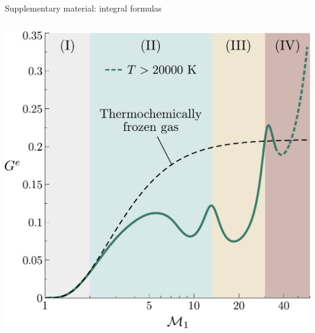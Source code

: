 \documentclass[9pt, aspectratio=1609]{beamer}
\begin{document}
\begin{frame}{\large Supplementary material: integral formulas}
\begin{columns}[c]
\begin{column}{.45\textwidth}
\begin{center}
        \includegraphics[width=1\textwidth]{figures/huete2021/G3D_AIAA2023.pdf}
    \end{center}
    \end{column}%
\end{columns}
\vspace{0.3cm}
\end{frame}
\end{document}
